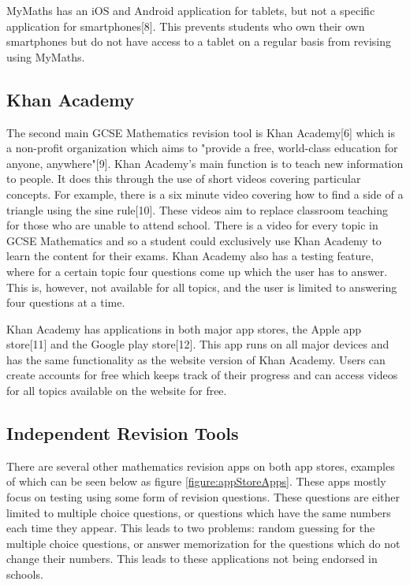 \documentclass{article}
\begin{document}
MyMaths has an iOS and Android application for tablets, but not a specific application for smartphones[8]. This prevents students who own their own smartphones but do not have access to a tablet on a regular basis from revising using MyMaths. \par

\subsection{Khan Academy}

The second main GCSE Mathematics revision tool is Khan Academy[6] which is a non-profit organization which aims to "provide a free, world-class education for anyone, anywhere"[9]. Khan Academy's main function is to teach new information to people. It does this through the use of short videos covering particular concepts. For example, there is a six minute video covering how to find a side of a triangle using the sine rule[10]. These videos aim to replace classroom teaching for those who are unable to attend school. There is a video for every topic in GCSE Mathematics and so a student could exclusively use Khan Academy to learn the content for their exams. Khan Academy also has a testing feature, where for a certain topic four questions come up which the user has to answer. This is, however, not available for all topics, and the user is limited to answering four questions at a time. \par

Khan Academy has applications in both major app stores, the Apple app store[11] and the Google play store[12]. This app runs on all major devices and has the same functionality as the website version of Khan Academy. Users can create accounts for free which keeps track of their progress and can access videos for all topics available on the website for free. \par

\subsection{Independent Revision Tools}

There are several other mathematics revision apps on both app stores, examples of which can be seen below as figure \ref{figure:appStoreApps}. These apps mostly focus on testing using some form of revision questions. These questions are either limited to multiple choice questions, or questions which have the same numbers each time they appear. This leads to two problems: random guessing for the multiple choice questions, or answer memorization for the questions which do not change their numbers. This leads to these applications not being endorsed in schools. \par
\end{document}
